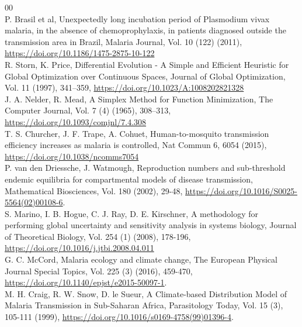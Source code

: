 \documentclass[a4paper,fleqn]{cas-dc}
\begin{document}
\begin{thebibliography}{00}
\\
 P. Brasil et al, Unexpectedly long incubation period of Plasmodium vivax malaria, in the absence of chemoprophylaxis, in patients diagnosed outside the transmission area in Brazil, Malaria Journal, Vol. 10 (122) (2011), \href{https://doi.org/10.1186/1475-2875-10-122}{https://doi.org/10.1186/1475-2875-10-122}
\\
 R. Storn, K. Price, Differential Evolution - A Simple and Efficient Heuristic for Global Optimization over Continuous Spaces, Journal of Global Optimization, Vol. 11 (1997), 341–359, \href{https://doi.org/10.1023/A:1008202821328}{https://doi.org/10.1023/A:1008202821328}
\\
 J. A. Nelder, R. Mead, A Simplex Method for Function Minimization, The Computer Journal, Vol. 7 (4) (1965), 308–313, \href{https://doi.org/10.1093/comjnl/7.4.308}{https://doi.org/10.1093/comjnl/7.4.308}
\\
 T. S. Churcher, J. F. Trape, A. Cohuet, Human-to-mosquito transmission efficiency increases as malaria is controlled, Nat Commun 6, 6054 (2015), \href{https://doi.org/10.1038/ncomms7054}{https://doi.org/10.1038/ncomms7054}
\\
 P. van den Driessche, J. Watmough, Reproduction numbers and sub-threshold endemic equilibria for compartmental models of disease transmission, Mathematical Biosciences, Vol. 180 (2002), 29-48, \href{https://doi.org/10.1016/S0025-5564(02)00108-6}{https://doi.org/10.1016/S0025-5564(02)00108-6}.
\\
 S. Marino, I. B. Hogue, C. J. Ray, D. E. Kirschner, A methodology for performing global uncertainty and sensitivity analysis in systems biology, Journal of Theoretical Biology, Vol. 254 (1) (2008), 178-196, \href{https://doi.org/10.1016/j.jtbi.2008.04.011}{https://doi.org/10.1016/j.jtbi.2008.04.011}
\\
 G. C. McCord, Malaria ecology and climate change, The European Physical Journal Special Topics, Vol. 225 (3) (2016), 459-470, \href{https://doi.org/10.1140/epjst/e2015-50097-1}{https://doi.org/10.1140/epjst/e2015-50097-1}.
\\
 M. H. Craig, R. W. Snow, D. le Sueur, A Climate-based Distribution Model of Malaria Transmission in Sub-Saharan Africa, Parasitology Today, Vol. 15 (3), 105-111 (1999), \href{https://doi.org/10.1016/s0169-4758(99)01396-4}{https://doi.org/10.1016/s0169-4758(99)01396-4}.

\end{thebibliography}
\end{document}
